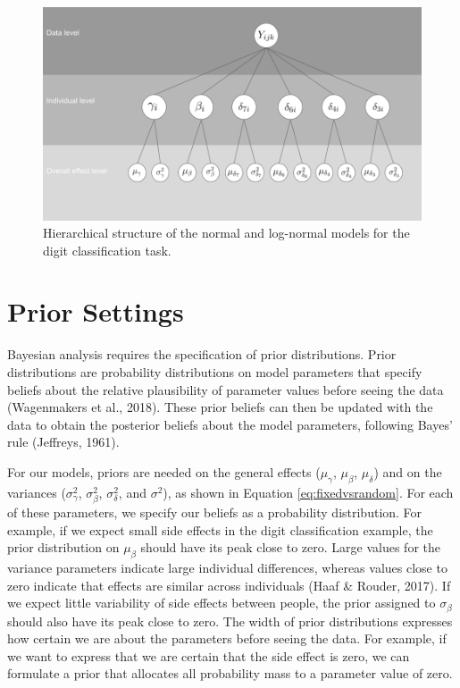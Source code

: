 \documentclass[
  english,
  doc,floatsintext]{apa6}
\begin{document}
\begin{figure}[H]

\includegraphics[width=0.7\linewidth]{Images/Fig2_Hierarchical structure} \hfill{}

\caption{Hierarchical structure of the normal and log-normal models for the digit classification task.}\label{fig:hierarchyplot}
\end{figure}

\hypertarget{prior-settings}{%
\section{Prior Settings}\label{prior-settings}}

Bayesian analysis requires the specification of prior distributions. Prior distributions are probability distributions on model parameters that specify beliefs about the relative plausibility of parameter values before seeing the data (Wagenmakers et al., 2018). These prior beliefs can then be updated with the data to obtain the posterior beliefs about the model parameters, following Bayes' rule (Jeffreys, 1961).

For our models, priors are needed on the general effects (\(\mu_{\gamma}\), \(\mu_{\beta}\), \(\mu_{\delta}\)) and on the variances (\(\sigma_{\gamma}^2\), \(\sigma_{\beta}^2\), \(\sigma_{\delta}^2\), and \(\sigma^2\)), as shown in Equation \eqref{eq:fixedvsrandom}. For each of these parameters, we specify our beliefs as a probability distribution. For example, if we expect small side effects in the digit classification example, the prior distribution on \(\mu_{\beta}\) should have its peak close to zero. Large values for the variance parameters indicate large individual differences, whereas values close to zero indicate that effects are similar across individuals (Haaf \& Rouder, 2017). If we expect little variability of side effects between people, the prior assigned to \(\sigma_{\beta}\) should also have its peak close to zero. The width of prior distributions expresses how certain we are about the parameters before seeing the data. For example, if we want to express that we are certain that the side effect is zero, we can formulate a prior that allocates all probability mass to a parameter value of zero.
\end{document}
